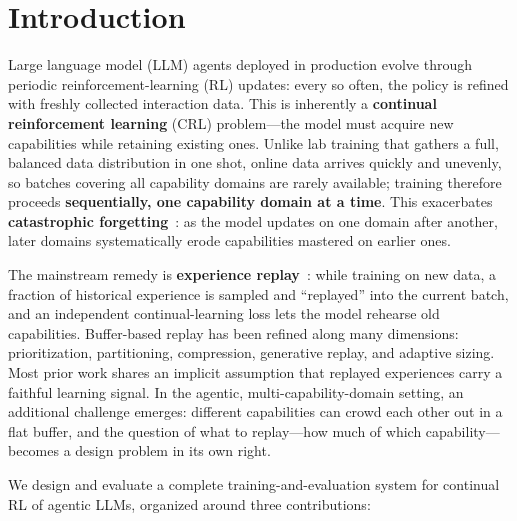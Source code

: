 \section{Introduction}
\label{sec:intro}

Large language model (LLM) agents deployed in production evolve through periodic reinforcement-learning (RL) updates: every so often, the policy is refined with freshly collected interaction data. This is inherently a \textbf{continual reinforcement learning} (CRL) problem---the model must acquire new capabilities while retaining existing ones. Unlike lab training that gathers a full, balanced data distribution in one shot, online data arrives quickly and unevenly, so batches covering all capability domains are rarely available; training therefore proceeds \textbf{sequentially, one capability domain at a time}. This exacerbates \textbf{catastrophic forgetting}~\cite{D1}: as the model updates on one domain after another, later domains systematically erode capabilities mastered on earlier ones.

The mainstream remedy is \textbf{experience replay}~\cite{A2}: while training on new data, a fraction of historical experience is sampled and ``replayed'' into the current batch, and an independent continual-learning loss lets the model rehearse old capabilities. Buffer-based replay has been refined along many dimensions: prioritization, partitioning, compression, generative replay, and adaptive sizing. Most prior work shares an implicit assumption that replayed experiences carry a faithful learning signal. In the agentic, multi-capability-domain setting, an additional challenge emerges: different capabilities can crowd each other out in a flat buffer, and the question of what to replay---how much of which capability---becomes a design problem in its own right.

We design and evaluate a complete training-and-evaluation system for continual RL of agentic LLMs, organized around three contributions:

